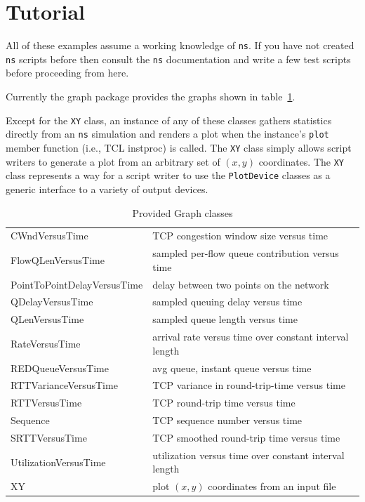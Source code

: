 \documentclass[11pt]{article}
\begin{document}

\section{Tutorial}\label{TutorialSection}

All of these examples assume a working knowledge of \verb|ns|.  If you 
have not created \verb|ns| scripts before then consult the \verb|ns| 
documentation and write a few test scripts before proceeding from here.

Currently the graph package provides the graphs shown in
table~\ref{GraphClassesTable}.

Except for the \verb|XY| class, an instance of any of these classes
gathers statistics directly from an \verb|ns| simulation and renders a plot
when the instance's \verb|plot| member function (i.e., TCL instproc)
is called.  The \verb|XY| class simply allows script writers to
generate a plot from an arbitrary set of $(x,y)$ coordinates.  The
\verb|XY| class represents a way for a script writer to use the
\verb|PlotDevice| classes as a generic interface to a variety of
output devices.

\begin{table}[ht]
\begin{center}
\begin{tabular}{|l|l|}\hline
  CWndVersusTime        & TCP congestion window size versus time \\
  FlowQLenVersusTime    & sampled per-flow queue contribution versus time \\
  PointToPointDelayVersusTime
                        & delay between two points on the network \\
  QDelayVersusTime      & sampled queuing delay versus time \\
  QLenVersusTime        & sampled queue length versus time \\
  RateVersusTime        & arrival rate versus time over constant 
                          interval length \\
  REDQueueVersusTime    & avg queue, instant queue versus time \\
  RTTVarianceVersusTime & TCP variance in round-trip-time versus time \\
  RTTVersusTime         & TCP round-trip time versus time \\
  Sequence              & TCP sequence number versus time \\
  SRTTVersusTime        & TCP smoothed round-trip time versus time \\
  UtilizationVersusTime & utilization versus time over constant 
                          interval length \\
  XY                    & plot $(x,y)$ coordinates from an input file \\\hline
\end{tabular}
\end{center}
\caption{Provided Graph classes}\label{GraphClassesTable}
\end{table}
\end{document}
